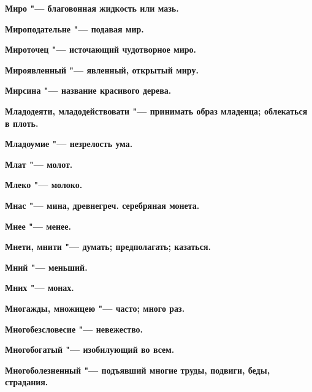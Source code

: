 \bfseries Миро \normalfont{} "--- благовонная жидкость или мазь. 




\bfseries Мироподательне \normalfont{} "--- подавая мир. 




\bfseries Мироточец \normalfont{} "--- источающий чудотворное миро. 




\bfseries Мироявленный \normalfont{} "--- явленный, открытый миру. 




\bfseries Мирсина \normalfont{} "--- название красивого дерева. 




\bfseries Младодеяти, младодействовати \normalfont{} "--- принимать образ младенца; облекаться в плоть. 




\bfseries Младоумие \normalfont{} "--- незрелость ума. 




\bfseries Млат \normalfont{} "--- молот. 




\bfseries Млеко \normalfont{} "--- молоко. 




\bfseries Мнас \normalfont{} "--- мина, древнегреч. серебряная монета. 




\bfseries Мнее \normalfont{} "--- менее. 




\bfseries Мнети, мнити \normalfont{} "--- думать; предполагать; казаться. 




\bfseries Мний \normalfont{} "--- меньший. 




\bfseries Мних \normalfont{} "--- монах. 




\bfseries Многажды, множицею \normalfont{} "--- часто; много раз. 




\bfseries Многобезсловесие \normalfont{} "--- невежество. 




\bfseries Многобогатый \normalfont{} "--- изобилующий во всем. 




\bfseries Многоболезненный \normalfont{} "--- подъявший многие труды, подвиги, беды, страдания. 




